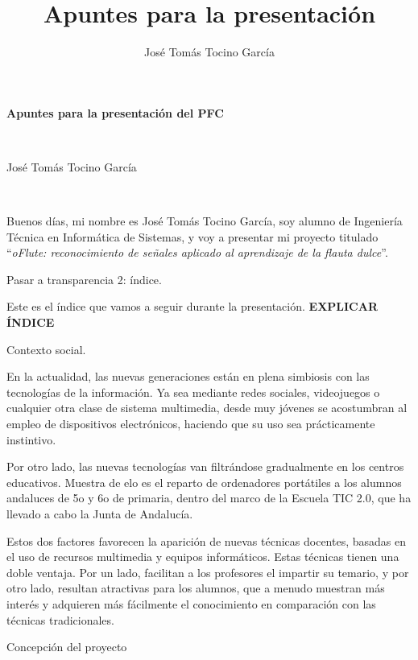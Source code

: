 \documentclass[landscape]{article}
\title{Apuntes para la presentación}
\author{José Tomás Tocino García}
\date{}
\newenvironment{nota}
{%
\begin{framed} \noindent\itshape
}
{%
\end{framed}\vspace{-0.5cm} }
\begin{document}
\pagestyle{empty}
\begin{multicols*}{2}

\begin{center}
  \begin{Large}\textbf{Apuntes para la presentación del PFC}\end{Large}\\
  \begin{large}José Tomás Tocino García\end{large}\\[0.1cm]
\end{center}

Buenos días, mi nombre es José Tomás Tocino García, soy alumno de Ingeniería
Técnica en Informática de Sistemas, y voy a presentar mi proyecto titulado
``\textit{oFlute: reconocimiento de señales aplicado al aprendizaje de la flauta
  dulce}''.

\begin{nota}
  Pasar a transparencia 2: índice.
\end{nota}

Este es el índice que vamos a seguir durante la presentación. \textbf{EXPLICAR
  ÍNDICE}

\begin{nota}
  Contexto social.
\end{nota}

En la actualidad, las nuevas generaciones están en plena simbiosis con las
tecnologías de la información. Ya sea mediante redes sociales, videojuegos o
cualquier otra clase de sistema multimedia, desde muy jóvenes se acostumbran al
empleo de dispositivos electrónicos, haciendo que su uso sea prácticamente
instintivo.

 Por otro lado, las nuevas tecnologías van filtrándose gradualmente en los
centros educativos. Muestra de elo es el reparto de ordenadores portátiles a los
alumnos andaluces de 5o y 6o de primaria, dentro del marco de la Escuela TIC
2.0, que ha llevado a cabo la Junta de Andalucía.

 Estos dos factores favorecen la aparición de nuevas técnicas docentes, basadas
en el uso de recursos multimedia y equipos informáticos. Estas técnicas tienen
una doble ventaja. Por un lado, facilitan a los profesores el impartir su
temario, y por otro lado, resultan atractivas para los alumnos, que a menudo
muestran más interés y adquieren más fácilmente el conocimiento en comparación
con las técnicas tradicionales.

\begin{nota}
  Concepción del proyecto
\end{nota}


\end{multicols*}
\end{document}
